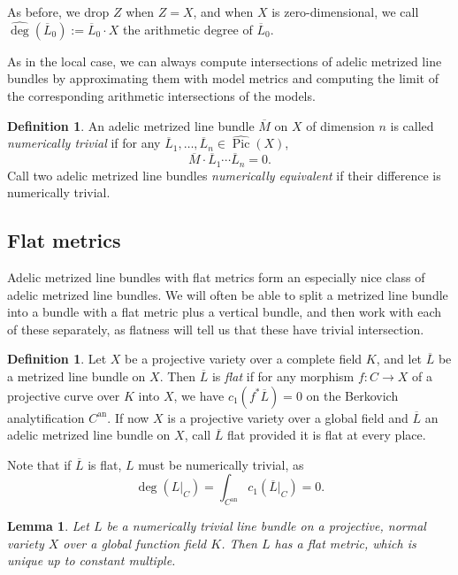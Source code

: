 \documentclass[times, doublespace]{amsart}
\numberwithin{equation}{section}
\theoremstyle{plain}
\newtheorem{lemma}[equation]{Lemma}
\theoremstyle{definition}
\newtheorem{definition}[equation]{Definition}
\DeclareMathOperator{\Pic}{Pic}
\DeclareMathOperator{\an}{an}
\begin{document}
As before, we drop $Z$ when $Z=X$, and when $X$ is zero-dimensional, we call $\widehat{\deg}(\overline L_0):=\overline L_0\cdot X$ the arithmetic degree of $\overline L_0$.

As in the local case, we can always compute intersections of adelic metrized line bundles by approximating them with model metrics and computing the limit of the corresponding arithmetic intersections of the models.

\begin{definition}
An adelic metrized line bundle $\overline M$ on $X$ of dimension $n$ is called \emph{numerically trivial} if for any $\overline L_1,\dots,\overline L_n\in\widehat{\Pic}(X)$,
\[\overline M\cdot \overline L_1\cdots\overline L_n=0.\]
Call two adelic metrized line bundles \emph{numerically equivalent} if their difference is numerically trivial.
\end{definition}



\subsection{Flat metrics}\label{flatsubsection}
Adelic metrized line bundles with flat metrics form an especially nice class of adelic metrized line bundles. We will often be able to split a metrized line bundle into a bundle with a flat metric plus a vertical bundle, and then work with each of these separately, as flatness will tell us that these have trivial intersection.

\begin{definition}
Let $X$ be a projective variety over a complete field $K$, and let $\overline L$ be a metrized line bundle on $X$. Then $\overline L$ is \emph{flat} if for any morphism $f:C\to X$ of a projective curve over $K$ into $X$, we have $c_1(f^*\overline L)=0$ on the Berkovich analytification $C^{\an}$. If now $X$ is a projective variety over a global field and $\overline L$ an adelic metrized line bundle on $X$, call $\overline L$ flat provided it is flat at every place.
\end{definition}
Note that if $\overline L$ is flat, $L$ must be numerically trivial, as
\[\deg(L|_C)=\int_{C^{\an}}c_1(\overline L|_C)=0.\]


\begin{lemma}\label{flatlemma}
Let $L$ be a numerically trivial line bundle on a projective, normal variety $X$ over a global function field $K$. Then $L$ has a flat metric, which is unique up to constant multiple. 
\end{lemma}
\end{document}
